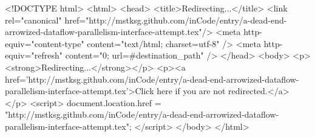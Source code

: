 <!DOCTYPE html>
<html>
<head>
<title>Redirecting...</title>
<link rel="canonical" href="http://mstksg.github.com/inCode/entry/a-dead-end-arrowized-dataflow-parallelism-interface-attempt.tex"/>
<meta http-equiv="content-type" content="text/html; charset=utf-8" />
<meta http-equiv="refresh" content="0; url=#{destination_path}" />
</head>
<body>
  <p><strong>Redirecting...</strong></p>
  <p><a href='http://mstksg.github.com/inCode/entry/a-dead-end-arrowized-dataflow-parallelism-interface-attempt.tex'>Click here if you are not redirected.</a></p>
  <script>
    document.location.href = "http://mstksg.github.com/inCode/entry/a-dead-end-arrowized-dataflow-parallelism-interface-attempt.tex";
  </script>
</body>
</html>
